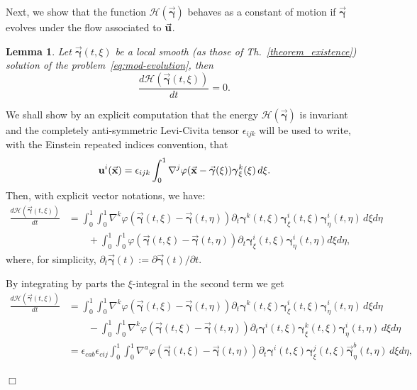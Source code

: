 \documentclass[a4paper,11pt]{article}
\numberwithin{equation}{section}
\newtheorem{lemma}{Lemma}
\newenvironment{proof}[1][Proof]{{\sc #1.} }{\hfill $\Box$}
\newcommand{\U}{\mbox{$\vec{\bf u}$}}
\newcommand{\UU}{\mbox{${\bf u}$}}
\newcommand{\bgamma}{\mbox{$\vec{\boldsymbol \gamma}$}}
\newcommand{\bbgamma}{\mbox{${\boldsymbol \gamma}$}}
\newcommand{\x}{\mbox{$\vec{\bf x}$}}
\begin{document}
%
Next, we show that the function $\mathcal{H}(\bgamma)$ behaves as a
constant of motion if $\bgamma$ evolves under the flow associated to
$\U$.
\begin{lemma}
\label{lemma:const-energy}
Let $\bgamma(t,\xi)$ be a local smooth (as those of Th.~\ref{theorem_existence}) solution of the
problem~\eqref{eq:mod-evolution}, then
$$
\frac{d \mathcal{H}(\bgamma(t,\xi))}{dt}=0.
$$
\end{lemma}
\begin{proof}
We shall show by an explicit computation that the energy
$\mathcal{H}(\bgamma)$ is invariant and the completely anti-symmetric
Levi-Civita tensor $\epsilon_{ijk}$ will be used to write, with the
Einstein repeated indices convention, that
$$
\UU^i(\x) =\epsilon_{ijk}\int_0^1 \nabla^j \varphi(\x-\bgamma(\xi)) 
\bbgamma^k_\xi(\xi)\,d\xi. 
$$ 
Then, with explicit vector notations, we have:
\begin{equation*}
  \begin{aligned}
\frac{d \mathcal{H}(\bgamma(t,\xi))}{dt} & =  
\int_0^1 \int_0^1 \nabla^k \varphi({\bgamma(t,\xi)}-{\bgamma(t,\eta)})
 {\partial_t\bbgamma^k(t,\xi)}{\bbgamma_\xi^i(t,\xi)}
{\bbgamma_\eta^i(t,\eta)}\,d\xi d\eta\\  
& \qquad + \int_0^1 \int_0^1 \varphi({\bgamma(t,\xi)}-
{\bgamma(t,\eta)})
{\partial_t\bbgamma_\xi^i(t,\xi)}
{\bbgamma_\eta^i(t,\eta)} d\xi d\eta,
  \end{aligned}
\end{equation*}
where, for simplicity, $\partial_t
\bgamma(t):=\partial\bgamma(t)/\partial t$.\par  
%
By integrating by parts the $\xi$-integral in the second term we get
\begin{equation*}
  \begin{aligned}
\frac{d \mathcal{H}({\bgamma(t,\xi)})}{dt} & = \int_0^1 \int_0^1
 \nabla^k \varphi({\bgamma(t,\xi)}-{\bgamma(t,\eta)})
{\partial_t\bbgamma^k(t,\xi)}{\bbgamma_\xi^i(t,\xi)}
{\bbgamma_\eta^i(t,\eta)}\, d\xi d\eta \\ 
& \qquad - \int_0^1 \int_0^1 \nabla^k
 \varphi({\bgamma(t,\xi)}-{\bgamma(t,\eta)})
 {\partial_t\bbgamma^i(t,\xi)} {\bbgamma_\xi^k(t,\xi)}
 {\bbgamma_\eta^i(t,\eta)}\, d\xi d\eta \\ 
& = \epsilon_{cab} \epsilon_{cij} \int_0^1 \int_0^1 \nabla^a
 \varphi({\bgamma(t,\xi)}-{\bgamma(t,\eta)})
{\partial_t\bbgamma^i(t,\xi)}
{\bbgamma_\xi^j(t,\xi)}{\bgamma_\eta^b(t,\eta)}\, d\xi d\eta,   
  \end{aligned}
\end{equation*}

\end{proof}
\end{document}
